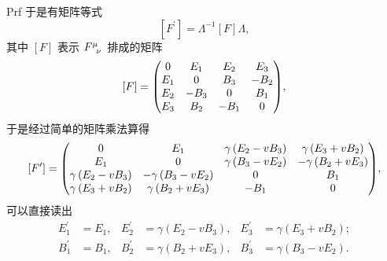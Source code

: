 \begin{xiti}
\begin{zm}
\begin{yl}{Prf}
			于是有矩阵等式
			\begin{equation*}
				\left[F^\prime\right] = \Lambda^{-1} \left[F\right] \Lambda,
			\end{equation*}
			其中 $\left[F\right]$ 表示 $\tensor{F}{^\mu_\nu}$ 排成的矩阵
			\begin{equation*}
				\left[F\right] = \mqty( 0 & E_1 & E_2 & E_3 \\ E_1 & 0 & B_3 & -B_2 \\ E_2 & -B_3 & 0 & B_1 \\ E_3 & B_2 & -B_1 & 0 ),
			\end{equation*}
			于是经过简单的矩阵乘法算得
			\begin{equation*}
				\left[ F^\prime \right] = \mqty( 0 & E_1 & \gamma \left( E_2 - v B_3 \right) & \gamma \left( E_3 + v B_2 \right) \\ E_1 & 0 & \gamma \left( B_3 - v E_2 \right) & - \gamma \left( B_2 + v E_3 \right) \\ \gamma \left( E_2 - v B_3 \right) & - \gamma \left( B_3 - v E_2 \right) & 0 & B_1 \\ \gamma \left( E_3 + v B_2 \right) & \gamma \left( B_2 + v E_3 \right) & -B_1 & 0 ),
			\end{equation*}
			可以直接读出
			\begin{align*}
				E_1^\prime &= E_1, & E_2^\prime &= \gamma \left( E_2 - v B_3 \right), & E_3^\prime &= \gamma \left( E_3 + v B_2 \right);\\
				B_1^\prime &= B_1, & B_2^\prime &= \gamma \left( B_2 + v E_3 \right), & B_3^\prime &= \gamma \left( B_3 - v E_2 \right).
			\end{align*}
		\end{yl}
	\end{zm}
	
\end{xiti}